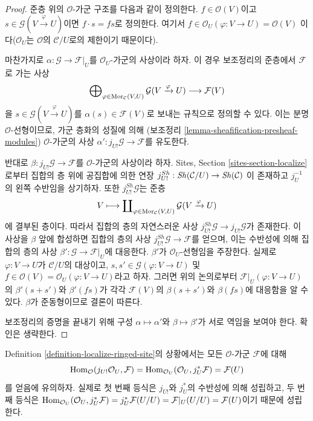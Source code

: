 \begin{proof}
준층 위의 $\mathcal{O}$-가군 구조를 다음과 같이 정의한다.
$f \in \mathcal{O}(V)$이고
$s \in \mathcal{G}(V \xrightarrow{\varphi} U)$이면
$f \cdot s = fs$로 정의한다. 여기서
$f \in \mathcal{O}_U(\varphi : V \to U) = \mathcal{O}(V)$
이다($\mathcal{O}_U$는 $\mathcal{O}$의 $\mathcal{C}/U$로의 제한이기 때문이다).

\medskip\noindent
마찬가지로 $\alpha : \mathcal{G} \to \mathcal{F}|_U$를
$\mathcal{O}_U$-가군의 사상이라 하자. 이 경우 보조정리의 준층에서
$\mathcal{F}$로 가는 사상
$$
\bigoplus\nolimits_{\varphi \in \mathop{\mathrm{Mor}}\nolimits_\mathcal{C}(V, U)}
\mathcal{G}(V \xrightarrow{\varphi} U)
\longrightarrow
\mathcal{F}(V)
$$
을 $s \in \mathcal{G}(V \xrightarrow{\varphi} U)$를
$\alpha(s) \in \mathcal{F}(V)$로 보내는 규칙으로 정의할 수 있다.
이는 분명 $\mathcal{O}$-선형이므로, 가군 층화의 성질에 의해
(보조정리 \ref{lemma-sheafification-presheaf-modules})
$\mathcal{O}$-가군의 사상
$\alpha' : j_{U!}\mathcal{G} \to \mathcal{F}$를 유도한다.

\medskip\noindent
반대로 $\beta : j_{U!}\mathcal{G} \to \mathcal{F}$를
$\mathcal{O}$-가군의 사상이라 하자. Sites, Section
\ref{sites-section-localize}로부터 집합의 층 위에 공집합에 의한 연장
$j^{Sh}_{U!} : \mathop{\mathit{Sh}}\nolimits(\mathcal{C}/U) \to \mathop{\mathit{Sh}}\nolimits(\mathcal{C})$
이 존재하고 $j_U^{-1}$의 왼쪽 수반임을 상기하자. 또한
$j^{Sh}_{U!}\mathcal{G}$는 준층
$$
V
\longmapsto
\coprod\nolimits_{\varphi \in \mathop{\mathrm{Mor}}\nolimits_\mathcal{C}(V, U)}
\mathcal{G}(V \xrightarrow{\varphi} U)
$$
에 결부된 층이다. 따라서 집합의 층의 자연스러운 사상
$j^{Sh}_{U!}\mathcal{G} \to j_{U!}\mathcal{G}$가 존재한다. 이 사상을
$\beta$ 앞에 합성하면 집합의 층의 사상
$j^{Sh}_{U!}\mathcal{G} \to \mathcal{F}$를 얻으며, 이는 수반성에 의해
집합의 층의 사상 $\beta' : \mathcal{G} \to \mathcal{F}|_U$에 대응한다.
$\beta'$가 $\mathcal{O}_U$-선형임을 주장한다. 실제로
$\varphi : V \to U$가 $\mathcal{C}/U$의 대상이고,
$s, s' \in \mathcal{G}(\varphi : V \to U)$ 및
$f \in \mathcal{O}(V) = \mathcal{O}_U(\varphi : V \to U)$라고 하자.
그러면 위의 논의로부터 $\mathcal{F}|_U(\varphi : V \to U)$의
$\beta'(s + s')$와 $\beta'(fs)$가 각각 $\mathcal{F}(V)$의
$\beta(s + s')$와 $\beta(fs)$에 대응함을 알 수 있다.
$\beta$가 준동형이므로 결론이 따른다.

\medskip\noindent
보조정리의 증명을 끝내기 위해 구성
$\alpha \mapsto \alpha'$와 $\beta \mapsto \beta'$가 서로 역임을 보여야 한다.
확인은 생략한다.
\end{proof}

\noindent
Definition \ref{definition-localize-ringed-site}의 상황에서는 모든
$\mathcal{O}$-가군 $\mathcal{F}$에 대해
\begin{equation}
\label{equation-map-lower-shriek-OU-into-module}
\mathop{\mathrm{Hom}}\nolimits_\mathcal{O}(j_{U!}\mathcal{O}_U, \mathcal{F}) =
\mathop{\mathrm{Hom}}\nolimits_{\mathcal{O}_U}(\mathcal{O}_U, j_U^*\mathcal{F}) =
\mathcal{F}(U)
\end{equation}
를 얻음에 유의하자. 실제로 첫 번째 등식은 $j_{U!}$와 $j_U^*$의
수반성에 의해 성립하고, 두 번째 등식은
$\mathop{\mathrm{Hom}}\nolimits_{\mathcal{O}_U}(\mathcal{O}_U, j_U^*\mathcal{F}) =
j_U^*\mathcal{F}(U/U) = \mathcal{F}|_U(U/U) = \mathcal{F}(U)$이기 때문에
성립한다.

